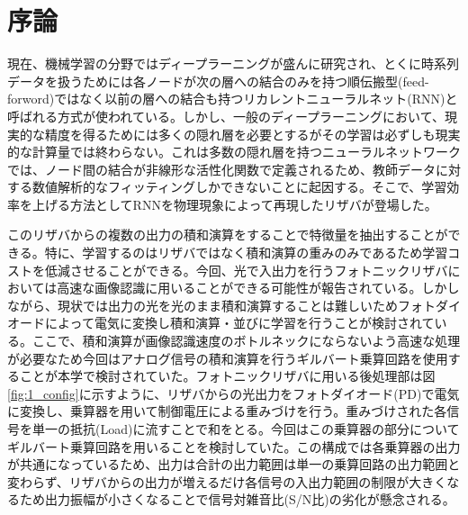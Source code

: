 \chapter{序論}
現在、機械学習の分野ではディープラーニングが盛んに研究され、とくに時系列データを扱うためには各ノードが次の層への結合のみを持つ順伝搬型(feed-forword)ではなく以前の層への結合も持つリカレントニューラルネット(RNN)と呼ばれる方式が使われている。しかし、一般のディープラーニングにおいて、現実的な精度を得るためには多くの隠れ層を必要とするがその学習は必ずしも現実的な計算量では終わらない。これは多数の隠れ層を持つニューラルネットワークでは、ノード間の結合が非線形な活性化関数で定義されるため、教師データに対する数値解析的なフィッティングしかできないことに起因する。そこで、学習効率を上げる方法としてRNNを物理現象によって再現したリザバが登場した。\par
このリザバからの複数の出力の積和演算をすることで特徴量を抽出することができる。特に、学習するのはリザバではなく積和演算の重みのみであるため学習コストを低減させることができる。今回、光で入出力を行うフォトニックリザバにおいては高速な画像認識に用いることができる可能性が報告されている。しかしながら、現状では出力の光を光のまま積和演算することは難しいためフォトダイオードによって電気に変換し積和演算・並びに学習を行うことが検討されている。ここで、積和演算が画像認識速度のボトルネックにならないよう高速な処理が必要なため今回はアナログ信号の積和演算を行うギルバート乗算回路を使用することが本学で検討されていた。フォトニックリザバに用いる後処理部は図\ref{fig:1_config}に示すように、リザバからの光出力をフォトダイオード(PD)で電気に変換し、乗算器を用いて制御電圧による重みづけを行う。重みづけされた各信号を単一の抵抗(Load)に流すことで和をとる。今回はこの乗算器の部分についてギルバート乗算回路を用いることを検討していた。この構成では各乗算器の出力が共通になっているため、出力は合計の出力範囲は単一の乗算回路の出力範囲と変わらず、リザバからの出力が増えるだけ各信号の入出力範囲の制限が大きくなるため出力振幅が小さくなることで信号対雑音比(S/N比)の劣化が懸念される。
